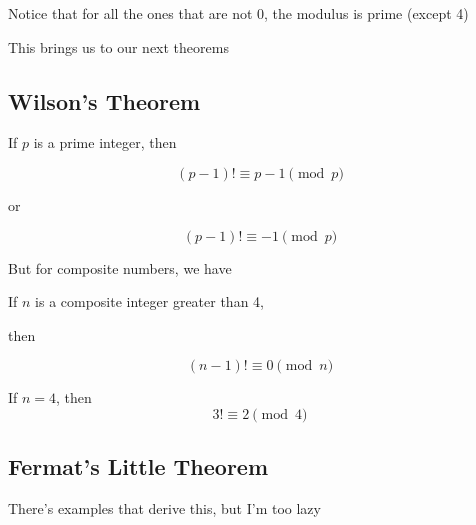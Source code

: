 \documentclass[../../Main.tex]{subfiles}
\begin{document}
Notice that for all the ones that are not 0, the modulus is prime (except 4)

This brings us to our next theorems

\subsection{Wilson's Theorem}

\begin{theorem}
    If $p$ is a prime integer, then

    $$(p - 1)! \equiv p - 1 \pmod{p}$$
    
    or

    $$(p - 1)! \equiv -1 \pmod{p}$$
\end{theorem}

But for composite numbers, we have

\begin{theorem}
    If $n$ is a composite integer greater than 4,

    then

    $$(n-1)! \equiv 0 \pmod{n}$$

    If $n = 4$, then $$3! \equiv 2 \pmod{4}$$
\end{theorem}

\subsection{Fermat's Little Theorem}

There's examples that derive this, but I'm too lazy
\end{document}
